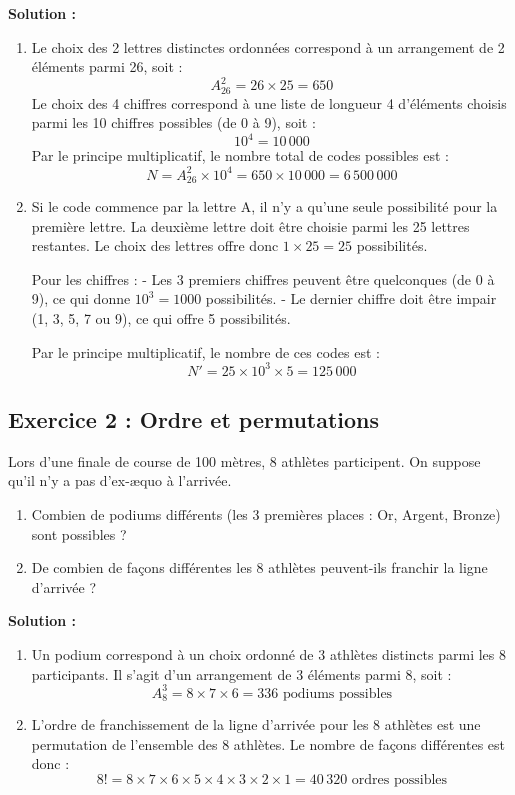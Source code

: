 \textbf{Solution :}
\begin{enumerate}
    \item Le choix des 2 lettres distinctes ordonnées correspond à un arrangement de 2 éléments parmi 26, soit :
    \[
    A_{26}^2 = 26 \times 25 = 650
    \]
    Le choix des 4 chiffres correspond à une liste de longueur 4 d'éléments choisis parmi les 10 chiffres possibles (de 0 à 9), soit :
    \[
    10^4 = 10\,000
    \]
    Par le principe multiplicatif, le nombre total de codes possibles est :
    \[
    N = A_{26}^2 \times 10^4 = 650 \times 10\,000 = 6\,500\,000
    \]
    
    \item Si le code commence par la lettre A, il n'y a qu'une seule possibilité pour la première lettre. La deuxième lettre doit être choisie parmi les 25 lettres restantes. Le choix des lettres offre donc $1 \times 25 = 25$ possibilités.
    
    Pour les chiffres :
    - Les 3 premiers chiffres peuvent être quelconques (de 0 à 9), ce qui donne $10^3 = 1000$ possibilités.
    - Le dernier chiffre doit être impair (1, 3, 5, 7 ou 9), ce qui offre 5 possibilités.
    
    Par le principe multiplicatif, le nombre de ces codes est :
    \[
    N' = 25 \times 10^3 \times 5 = 125\,000
    \]
\end{enumerate}

\subsection*{Exercice 2 : Ordre et permutations}
Lors d'une finale de course de 100 mètres, 8 athlètes participent. On suppose qu'il n'y a pas d'ex-æquo à l'arrivée.
\begin{enumerate}
    \item Combien de podiums différents (les 3 premières places : Or, Argent, Bronze) sont possibles ?
    \item De combien de façons différentes les 8 athlètes peuvent-ils franchir la ligne d'arrivée ?
\end{enumerate}

\textbf{Solution :}
\begin{enumerate}
    \item Un podium correspond à un choix ordonné de 3 athlètes distincts parmi les 8 participants. Il s'agit d'un arrangement de 3 éléments parmi 8, soit :
    \[
    A_8^3 = 8 \times 7 \times 6 = 336 \text{ podiums possibles}
    \]
    
    \item L'ordre de franchissement de la ligne d'arrivée pour les 8 athlètes est une permutation de l'ensemble des 8 athlètes. Le nombre de façons différentes est donc :
    \[
    8! = 8 \times 7 \times 6 \times 5 \times 4 \times 3 \times 2 \times 1 = 40\,320 \text{ ordres possibles}
    \]
\end{enumerate}

